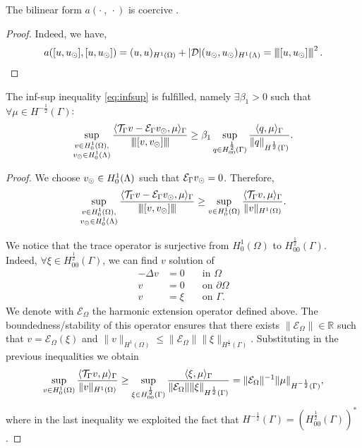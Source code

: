 \begin{lemma}\label{lemma:prob1_coercivity}
The bilinear form $a(\cdot \ , \ \cdot)$ is coercive .
\end{lemma}
\begin{proof}
 Indeed, we have,
\begin{equation*}
a([u,\ud], [u,\ud])= (u,u)_{H^1(\Omega)} + |{\cal D}|(\ud,\ud)_{H^1(\Lambda)} = \vertiii{[u,\ud]}^2\,.
\end{equation*}
\end{proof}
\begin{lemma}
The inf-sup inequality \eqref{eq:infsup} is fulfilled, namely $\exists \beta_1 >0$ such that $\forall \mu \in H^{-\frac 12}(\Gamma)$:
\begin{equation*}
\sup _{\substack{v\in H^1_0(\Omega),\\ v_{\odot} \in H^1_0(\Lambda)}} \frac{ \langle {\mathcal{T}_\Gamma} v  - \mathcal{E}_\Gamma v_{\odot}, \mu \rangle_\Gamma}{{\left\vert\kern-0.25ex\left\vert\kern-0.25ex\left\vert [v, v_{\odot}] \right\vert\kern-0.25ex\right\vert\kern-0.25ex\right\vert}}
\geq \beta_1 \sup_{q\in H^{\frac 12}_{00}(\Gamma)}\frac{\langle q, \mu\rangle_{\Gamma}}{\|q\|_{H^{\frac 12}(\Gamma)}}.
\end{equation*}
\end{lemma} 
\begin{proof}
We choose $v_{\odot} \in H^1_0(\Lambda)$ such that $\mathcal{E}_\Gamma v_{\odot} =0$. Therefore,
\begin{equation*}
\sup _{\substack{v\in H^1_0(\Omega),\\ v_{\odot} \in H^1_0(\Lambda)}} \frac{ \langle {\mathcal{T}_\Gamma} v  - \mathcal{E}_\Gamma v_{\odot}, \mu\rangle_\Gamma}{{\left\vert\kern-0.25ex\left\vert\kern-0.25ex\left\vert [v, v_{\odot}] \right\vert\kern-0.25ex\right\vert\kern-0.25ex\right\vert}} 
\geq \sup _{v\in H^1_0(\Omega)} \frac{ \langle {\mathcal{T}_\Gamma} v, \mu \rangle_\Gamma}{\|v\|_{H^1(\Omega)}}.
\end{equation*}

We notice that the trace operator is surjective from $H^1_0(\Omega)$ to $H^{\frac12}_{00}(\Gamma)$. Indeed, $\forall \xi \in H^{\frac 12}_{00}(\Gamma)$, we  can find $v$ solution of
\begin{eqnarray*}
-\Delta v&=0 \quad &\text{in }\Omega\\
v&=0 &\text{on }\partial \Omega\\
v&=\xi &\text{on } \Gamma. 
\end{eqnarray*}
We denote with $\mathcal{E}_\Omega$ the harmonic extension operator defined above.
The boundedness/stability of this operator ensures that there exists $\| \mathcal{E}_\Omega \| \in \mathbb{R}$ such that
$v=\mathcal{E}_\Omega(\xi) $ and $\|v \|_{H^1(\Omega)}\leq \|\mathcal{E}_\Omega\| \|\xi \|_{H^{\frac 12}(\Gamma)}$. 
Substituting in the previous inequalities we obtain
\begin{equation}\label{infsup_traceop}
\sup _{v\in H^1_0(\Omega)} \frac{ \langle \trace v, \mu \rangle_\Gamma}{\|v\|_{H^1(\Omega)}}
\geq  \sup _{\xi \in H^{\frac 12}_{00}(\Gamma )} \frac{ \langle \xi , \mu \rangle_\Gamma}{\|\mathcal{E}_\Omega\| \|\xi\|_{H^{\frac 12}(\Gamma)}}
= \|\mathcal{E}_\Omega\|^{-1} \|\mu\|_{H^{-\frac 12}(\Gamma)},
\end{equation}
where in the last inequality we exploited the fact that $H^{-\frac 12}(\Gamma)=(H^{\frac 12 }_{00}(\Gamma))^*$. 
\end{proof}


